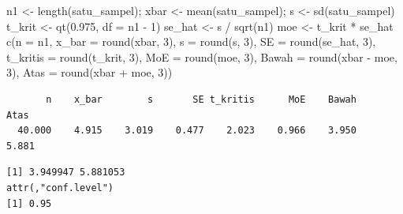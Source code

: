\documentclass[
  indonesian,
  letterpaper,
]{book}
\newenvironment{Shaded}{\begin{snugshade}}{\end{snugshade}}
\newcommand{\AttributeTok}[1]{\textcolor[rgb]{0.40,0.45,0.13}{#1}}
\newcommand{\CommentTok}[1]{\textcolor[rgb]{0.37,0.37,0.37}{#1}}
\newcommand{\DecValTok}[1]{\textcolor[rgb]{0.68,0.00,0.00}{#1}}
\newcommand{\FloatTok}[1]{\textcolor[rgb]{0.68,0.00,0.00}{#1}}
\newcommand{\FunctionTok}[1]{\textcolor[rgb]{0.28,0.35,0.67}{#1}}
\newcommand{\NormalTok}[1]{\textcolor[rgb]{0.00,0.23,0.31}{#1}}
\newcommand{\OtherTok}[1]{\textcolor[rgb]{0.00,0.23,0.31}{#1}}
\newcommand{\SpecialCharTok}[1]{\textcolor[rgb]{0.37,0.37,0.37}{#1}}
\begin{document}
\begin{Shaded}
\begin{Highlighting}[]
\NormalTok{n1 }\OtherTok{\textless{}{-}} \FunctionTok{length}\NormalTok{(satu\_sampel); xbar }\OtherTok{\textless{}{-}} \FunctionTok{mean}\NormalTok{(satu\_sampel); s }\OtherTok{\textless{}{-}} \FunctionTok{sd}\NormalTok{(satu\_sampel)}
\NormalTok{t\_krit }\OtherTok{\textless{}{-}} \FunctionTok{qt}\NormalTok{(}\FloatTok{0.975}\NormalTok{, }\AttributeTok{df =}\NormalTok{ n1 }\SpecialCharTok{{-}} \DecValTok{1}\NormalTok{)}
\NormalTok{se\_hat }\OtherTok{\textless{}{-}}\NormalTok{ s }\SpecialCharTok{/} \FunctionTok{sqrt}\NormalTok{(n1)}
\NormalTok{moe }\OtherTok{\textless{}{-}}\NormalTok{ t\_krit }\SpecialCharTok{*}\NormalTok{ se\_hat}
\FunctionTok{c}\NormalTok{(}\AttributeTok{n =}\NormalTok{ n1, }\AttributeTok{x\_bar =} \FunctionTok{round}\NormalTok{(xbar, }\DecValTok{3}\NormalTok{), }\AttributeTok{s =} \FunctionTok{round}\NormalTok{(s, }\DecValTok{3}\NormalTok{), }\AttributeTok{SE =} \FunctionTok{round}\NormalTok{(se\_hat, }\DecValTok{3}\NormalTok{),}
\AttributeTok{t\_kritis =} \FunctionTok{round}\NormalTok{(t\_krit, }\DecValTok{3}\NormalTok{), }\AttributeTok{MoE =} \FunctionTok{round}\NormalTok{(moe, }\DecValTok{3}\NormalTok{), }\AttributeTok{Bawah =} \FunctionTok{round}\NormalTok{(xbar }\SpecialCharTok{{-}}\NormalTok{ moe, }\DecValTok{3}\NormalTok{), }\AttributeTok{Atas =} \FunctionTok{round}\NormalTok{(xbar }\SpecialCharTok{+}\NormalTok{ moe, }\DecValTok{3}\NormalTok{))}
\end{Highlighting}
\end{Shaded}

\begin{verbatim}
       n    x_bar        s       SE t_kritis      MoE    Bawah     Atas 
  40.000    4.915    3.019    0.477    2.023    0.966    3.950    5.881 
\end{verbatim}

\begin{Shaded}
\end{Shaded}

\begin{verbatim}
[1] 3.949947 5.881053
attr(,"conf.level")
[1] 0.95
\end{verbatim}
\end{document}
